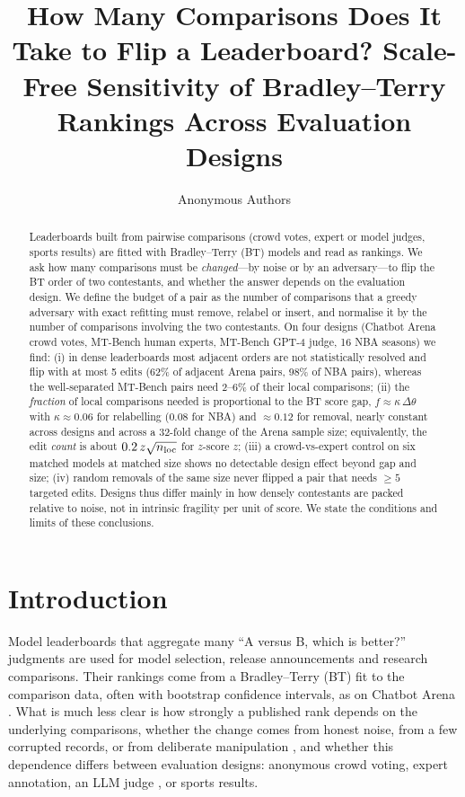 \documentclass{article}
\title{How Many Comparisons Does It Take to Flip a Leaderboard? Scale-Free Sensitivity of Bradley--Terry Rankings Across Evaluation Designs}
\author{Anonymous Authors}
\newcommand{\nloc}{n_{\rm loc}}
\begin{document}
\maketitle

\begin{abstract}
Leaderboards built from pairwise comparisons (crowd votes, expert or model judges, sports results) are fitted with Bradley--Terry (BT) models and read as rankings. We ask how many comparisons must be \emph{changed}---by noise or by an adversary---to flip the BT order of two contestants, and whether the answer depends on the evaluation design. We define the budget of a pair as the number of comparisons that a greedy adversary with exact refitting must remove, relabel or insert, and normalise it by the number of comparisons involving the two contestants. On four designs (Chatbot Arena crowd votes, MT-Bench human experts, MT-Bench GPT-4 judge, 16 NBA seasons) we find: (i) in dense leaderboards most adjacent orders are not statistically resolved and flip with at most 5 edits (62\% of adjacent Arena pairs, 98\% of NBA pairs), whereas the well-separated MT-Bench pairs need 2--6\% of their local comparisons; (ii) the \emph{fraction} of local comparisons needed is proportional to the BT score gap, $f\approx\kappa\,\Delta\theta$ with $\kappa\approx0.06$ for relabelling (0.08 for NBA) and $\approx0.12$ for removal, nearly constant across designs and across a 32-fold change of the Arena sample size; equivalently, the edit \emph{count} is about $0.2\,z\sqrt{\nloc}$ for $z$-score $z$; (iii) a crowd-vs-expert control on six matched models at matched size shows no detectable design effect beyond gap and size; (iv) random removals of the same size never flipped a pair that needs $\geq5$ targeted edits. Designs thus differ mainly in how densely contestants are packed relative to noise, not in intrinsic fragility per unit of score. We state the conditions and limits of these conclusions.
\end{abstract}

\section{Introduction}
Model leaderboards that aggregate many ``A versus B, which is better?'' judgments are used for model selection, release announcements and research comparisons. Their rankings come from a Bradley--Terry (BT) fit \citep{bradley1952} to the comparison data, often with bootstrap confidence intervals, as on Chatbot Arena \citep{chiang2024}. What is much less clear is how strongly a published rank depends on the underlying comparisons, whether the change comes from honest noise, from a few corrupted records, or from deliberate manipulation \citep{min2025,singh2025}, and whether this dependence differs between evaluation designs: anonymous crowd voting, expert annotation, an LLM judge \citep{zheng2023}, or sports results.
\end{document}
